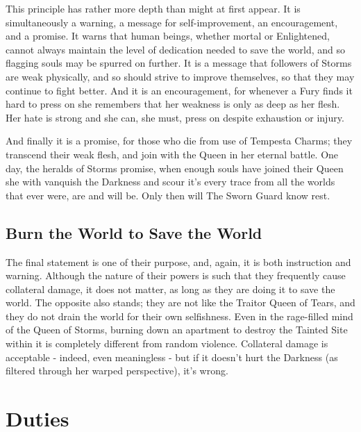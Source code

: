 This principle has rather more depth than might at first appear. It is simultaneously a warning, a message for self-improvement, an encouragement, and a promise. It warns that human beings, whether mortal or Enlightened, cannot always maintain the level of dedication needed to save the world, and so flagging souls may be spurred on further. It is a message that followers of Storms are weak physically, and so should strive to improve themselves, so that they may continue to fight better. And it is an encouragement, for whenever a Fury finds it hard to press on she remembers that her weakness is only as deep as her flesh. Her hate is strong and she can, she must, press on despite exhaustion or injury.

And finally it is a promise, for those who die from use of Tempesta Charms; they transcend their weak flesh, and join with the Queen in her eternal battle. One day, the heralds of Storms promise, when enough souls have joined their Queen she with vanquish the Darkness and scour it's every trace from all the worlds that ever were, are and will be. Only then will The Sworn Guard know rest.  

\subsection*{Burn the World to Save the World}

The final statement is one of their purpose, and, again, it is both instruction and warning. Although the nature of their powers is such that they frequently cause collateral damage, it does not matter, as long as they are doing it to save the world. The opposite also stands; they are not like the Traitor Queen of Tears, and they do not drain the world for their own selfishness. Even in the rage-filled mind of the Queen of Storms, burning down an apartment to destroy the Tainted Site within it is completely different from random violence. Collateral damage is acceptable - indeed, even meaningless - but if it doesn't hurt the Darkness (as filtered through her warped perspective), it's wrong. 

\section*{Duties}

